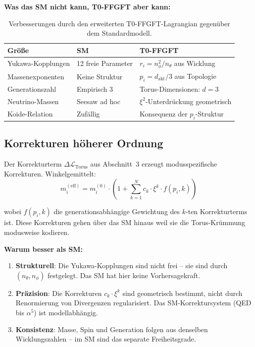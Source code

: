 \textbf{Was das SM nicht kann, T0-FFGFT aber kann:}

\begin{table}[htbp]
\centering\footnotesize
\begin{tabular}{lll}
\toprule
\textbf{Größe} & \textbf{SM} & \textbf{T0-FFGFT} \\
\midrule
Yukawa-Kopplungen & 12 freie Parameter & $r_i = n_\phi^2/n_\theta$ aus Wicklung \\
Massenexponenten  & Keine Struktur     & $p_i = d_{\text{akt}}/3$ aus Topologie \\
Generationszahl   & Empirisch 3        & Torus-Dimensionen: $d=3$ \\
Neutrino-Massen   & Seesaw ad hoc      & $\xi^2$-Unterdrückung geometrisch \\
Koide-Relation    & Zufällig           & Konsequenz der $p_i$-Struktur \\
\bottomrule
\end{tabular}
\caption{Verbesserungen durch den erweiterten T0-FFGFT-Lagrangian
gegenüber dem Standardmodell.}
\label{tab:verbesserungen}
\end{table}

\subsection{Korrekturen höherer Ordnung}

Der Korrekturterm $\Delta\mathcal{L}_{\text{Torus}}$ aus
Abschnitt~3 erzeugt modusspezifische Korrekturen. Winkelgemittelt:
\begin{equation}
    m_i^{(\text{eff})} = m_i^{(0)} \cdot
    \left(1 + \sum_{k=1}^{N} c_k \cdot \xi^k \cdot f(p_i, k)\right)
\end{equation}

wobei $f(p_i, k)$ die generationsabhängige Gewichtung des
$k$-ten Korrekturterms ist. Diese Korrekturen gehen über das
SM hinaus weil sie die Torus-Krümmung modusweise kodieren.

\textbf{Warum besser als SM:}
\begin{enumerate}
    \item \textbf{Strukturell}: Die Yukawa-Kopplungen sind nicht
          frei -- sie sind durch $(n_\theta, n_\phi)$ festgelegt.
          Das SM hat hier keine Vorhersagekraft.

    \item \textbf{Präzision}: Die Korrekturen $c_k \cdot \xi^k$
          sind geometrisch bestimmt, nicht durch Renormierung
          von Divergenzen regularisiert. Das SM-Korrektursystem
          (QED bis $\alpha^5$) ist modellabhängig.

    \item \textbf{Konsistenz}: Masse, Spin und Generation folgen
          aus denselben Wicklungszahlen -- im SM sind das
          separate Freiheitsgrade.
\end{enumerate}

